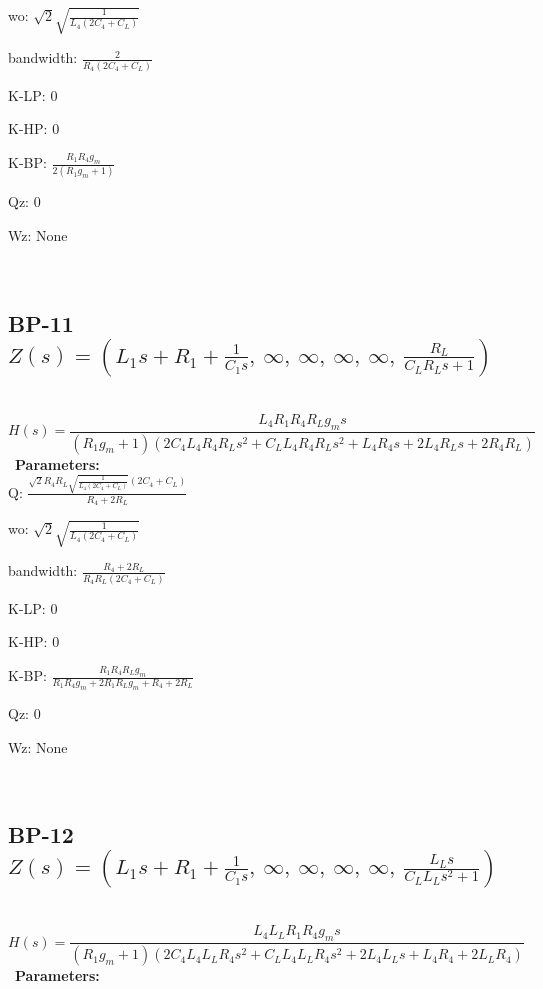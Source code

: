 \documentclass{article}
\begin{document}
wo: $\sqrt{2} \sqrt{\frac{1}{L_{4} \left(2 C_{4} + C_{L}\right)}}$\ 

bandwidth: $\frac{2}{R_{4} \left(2 C_{4} + C_{L}\right)}$\ 

K-LP: $0$\ 

K-HP: $0$\ 

K-BP: $\frac{R_{1} R_{4} g_{m}}{2 \left(R_{1} g_{m} + 1\right)}$\ 

Qz: $0$\ 

Wz: $\text{None}$\ 

\ 

\subsection{BP-11 $Z(s) = \left( L_{1} s + R_{1} + \frac{1}{C_{1} s}, \  \infty, \  \infty, \  \infty, \  \infty, \  \frac{R_{L}}{C_{L} R_{L} s + 1}\right)$ } \ 
\textbf{\[H(s) = \frac{L_{4} R_{1} R_{4} R_{L} g_{m} s}{\left(R_{1} g_{m} + 1\right) \left(2 C_{4} L_{4} R_{4} R_{L} s^{2} + C_{L} L_{4} R_{4} R_{L} s^{2} + L_{4} R_{4} s + 2 L_{4} R_{L} s + 2 R_{4} R_{L}\right)}\] } \ 
\textbf{Parameters:}\\ 

Q: $\frac{\sqrt{2} R_{4} R_{L} \sqrt{\frac{1}{L_{4} \left(2 C_{4} + C_{L}\right)}} \left(2 C_{4} + C_{L}\right)}{R_{4} + 2 R_{L}}$\ 

wo: $\sqrt{2} \sqrt{\frac{1}{L_{4} \left(2 C_{4} + C_{L}\right)}}$\ 

bandwidth: $\frac{R_{4} + 2 R_{L}}{R_{4} R_{L} \left(2 C_{4} + C_{L}\right)}$\ 

K-LP: $0$\ 

K-HP: $0$\ 

K-BP: $\frac{R_{1} R_{4} R_{L} g_{m}}{R_{1} R_{4} g_{m} + 2 R_{1} R_{L} g_{m} + R_{4} + 2 R_{L}}$\ 

Qz: $0$\ 

Wz: $\text{None}$\ 

\ 

\subsection{BP-12 $Z(s) = \left( L_{1} s + R_{1} + \frac{1}{C_{1} s}, \  \infty, \  \infty, \  \infty, \  \infty, \  \frac{L_{L} s}{C_{L} L_{L} s^{2} + 1}\right)$ } \ 
\textbf{\[H(s) = \frac{L_{4} L_{L} R_{1} R_{4} g_{m} s}{\left(R_{1} g_{m} + 1\right) \left(2 C_{4} L_{4} L_{L} R_{4} s^{2} + C_{L} L_{4} L_{L} R_{4} s^{2} + 2 L_{4} L_{L} s + L_{4} R_{4} + 2 L_{L} R_{4}\right)}\] } \ 
\textbf{Parameters:}\\ 
\end{document}
